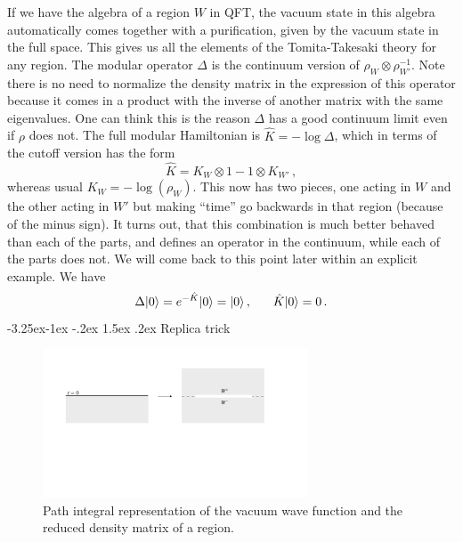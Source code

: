 \documentclass[11pt,a4paper]{article}
\makeatletter
\renewcommand\subsection{\@startsection{subsection}{2}{\z@}%
                                   {-3.25ex\@plus -1ex \@minus -.2ex}%
                                     {1.5ex \@plus .2ex}%
                                     {\normalfont\bfseries}}
\numberwithin{equation}{section}
\newcommand{\be}{\begin{equation}}
\newcommand{\ee}{\end{equation}}
\makeatother
\begin{document}
If we have the algebra of a region $W$ in QFT, the vacuum state in this algebra automatically comes together with a purification, given by the vacuum state in the full space. This gives us all the elements of the Tomita-Takesaki theory for any region. The modular operator $\Delta$ is the continuum version of $\rho_W\otimes \rho_{W'}^{-1}$. Note there is no need to normalize the density matrix in the expression of this operator because it comes in a product with the inverse of another matrix with the same eigenvalues. One can think this is the reason $\Delta$ has a good continuum limit even if $\rho$ does not. The full modular Hamiltonian is $\hat{K}=-\log \Delta$, which in terms of the cutoff version has the form
\be 
\hat{K}= K_W \otimes 1 - 1\otimes K_{W'}\,,\label{full}
\ee
whereas usual $K_{W}=-\log(\rho_W)$. This now has two pieces, one acting in $W$ and the other acting in $W'$ but making ``time'' go backwards in that region (because of the minus sign). It turns out, that this combination is much better behaved than each of the parts, and defines an operator in the continuum, while each of the parts does not.  We will come back to this point later within an explicit example. We have
\be
\Delta |0\rangle=e^{-\hat{K}} |0\rangle=|0\rangle\,,\hspace{.6cm}   \hat{K} |0\rangle=0\,. 
\ee
\subsection{Replica trick}
\begin{figure}[t]
\begin{center}  
\includegraphics[width=0.7\textwidth]{replica.pdf}
\captionsetup{width=0.9\textwidth}
\caption{Path integral representation of the vacuum wave function and the reduced density matrix of a region. }
\label{replica}
\end{center}  
\end{figure} 
\end{document}
